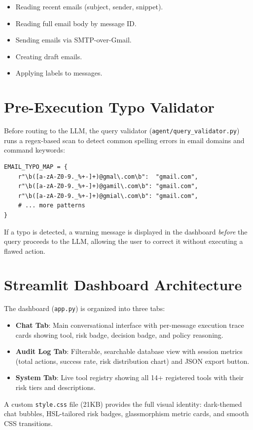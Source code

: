 \begin{itemize}[leftmargin=1.5em]
  \item Reading recent emails (subject, sender, snippet).
  \item Reading full email body by message ID.
  \item Sending emails via SMTP-over-Gmail.
  \item Creating draft emails.
  \item Applying labels to messages.
\end{itemize}

\section{Pre-Execution Typo Validator}

Before routing to the LLM, the query validator (\texttt{agent/query\_validator.py}) runs a regex-based scan to detect common spelling errors in email domains and command keywords:

\begin{lstlisting}[caption={Typo detection regex patterns}, label={lst:typo}]
EMAIL_TYPO_MAP = {
    r"\b([a-zA-Z0-9._%+-]+)@gmal\.com\b":  "gmail.com",
    r"\b([a-zA-Z0-9._%+-]+)@gamil\.com\b": "gmail.com",
    r"\b([a-zA-Z0-9._%+-]+)@gmial\.com\b": "gmail.com",
    # ... more patterns
}
\end{lstlisting}

If a typo is detected, a warning message is displayed in the dashboard \textit{before} the query proceeds to the LLM, allowing the user to correct it without executing a flawed action.

\section{Streamlit Dashboard Architecture}

The dashboard (\texttt{app.py}) is organized into three tabs:

\begin{itemize}[leftmargin=1.5em]
  \item \textbf{Chat Tab}: Main conversational interface with per-message execution trace cards showing tool, risk badge, decision badge, and policy reasoning.
  \item \textbf{Audit Log Tab}: Filterable, searchable database view with session metrics (total actions, success rate, risk distribution chart) and JSON export button.
  \item \textbf{System Tab}: Live tool registry showing all 14+ registered tools with their risk tiers and descriptions.
\end{itemize}

A custom \texttt{style.css} file (21KB) provides the full visual identity: dark-themed chat bubbles, HSL-tailored risk badges, glassmorphism metric cards, and smooth CSS transitions.
